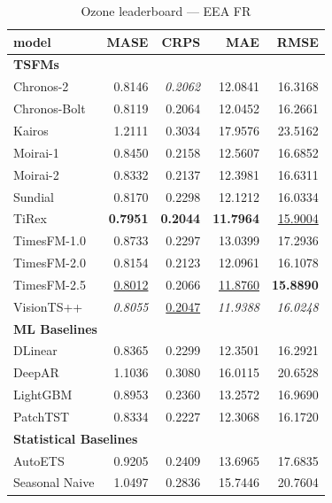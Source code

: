 \begin{table}[H]
\caption{Ozone leaderboard --- EEA FR}
\centering
\begin{small}
\begin{tabular}{lrrrr}
\toprule
model & MASE & CRPS & MAE & RMSE \\
\midrule
\multicolumn{5}{l}{\textbf{TSFMs}} \\
Chronos-2 & 0.8146 & \textit{0.2062} & 12.0841 & 16.3168 \\
Chronos-Bolt & 0.8119 & 0.2064 & 12.0452 & 16.2661 \\
Kairos & 1.2111 & 0.3034 & 17.9576 & 23.5162 \\
Moirai-1 & 0.8450 & 0.2158 & 12.5607 & 16.6852 \\
Moirai-2 & 0.8332 & 0.2137 & 12.3981 & 16.6311 \\
Sundial & 0.8170 & 0.2298 & 12.1212 & 16.0334 \\
TiRex & \textbf{0.7951} & \textbf{0.2044} & \textbf{11.7964} & \underline{15.9004} \\
TimesFM-1.0 & 0.8733 & 0.2297 & 13.0399 & 17.2936 \\
TimesFM-2.0 & 0.8154 & 0.2123 & 12.0961 & 16.1078 \\
TimesFM-2.5 & \underline{0.8012} & 0.2066 & \underline{11.8760} & \textbf{15.8890} \\
VisionTS++ & \textit{0.8055} & \underline{0.2047} & \textit{11.9388} & \textit{16.0248} \\
\midrule
\multicolumn{5}{l}{\textbf{ML Baselines}} \\
DLinear & 0.8365 & 0.2299 & 12.3501 & 16.2921 \\
DeepAR & 1.1036 & 0.3080 & 16.0115 & 20.6528 \\
LightGBM & 0.8953 & 0.2360 & 13.2572 & 16.9690 \\
PatchTST & 0.8334 & 0.2227 & 12.3068 & 16.1720 \\
\midrule
\multicolumn{5}{l}{\textbf{Statistical Baselines}} \\
AutoETS & 0.9205 & 0.2409 & 13.6965 & 17.6835 \\
Seasonal Naive & 1.0497 & 0.2836 & 15.7446 & 20.7604 \\
\bottomrule
\end{tabular}
\end{small}
\end{table}